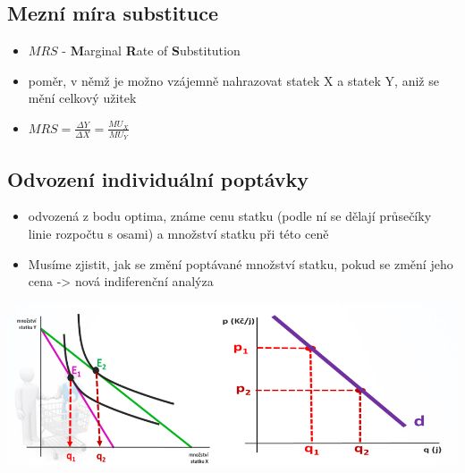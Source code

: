 \subsection{Mezní míra substituce}
\begin{itemize}
    \item $MRS$ - \textbf{M}arginal \textbf{R}ate of \textbf{S}ubstitution
    \item poměr, v němž je možno vzájemně nahrazovat statek X a statek Y, aniž se mění celkový užitek
    \item $MRS=\frac{\Delta Y}{\Delta X}=\frac{MU_X}{MU_Y}$
\end{itemize}

\subsection{Odvození individuální poptávky}
\begin{itemize}
    \item odvozená z bodu optima, známe cenu statku (podle ní se dělají průsečíky linie rozpočtu s osami) a množství statku při této ceně
    \item Musíme zjistit, jak se změní poptávané množství statku, pokud se změní jeho cena -> nová indiferenční analýza
\end{itemize}
\includegraphics[width=16cm]{images/poptavka_indif.png}
